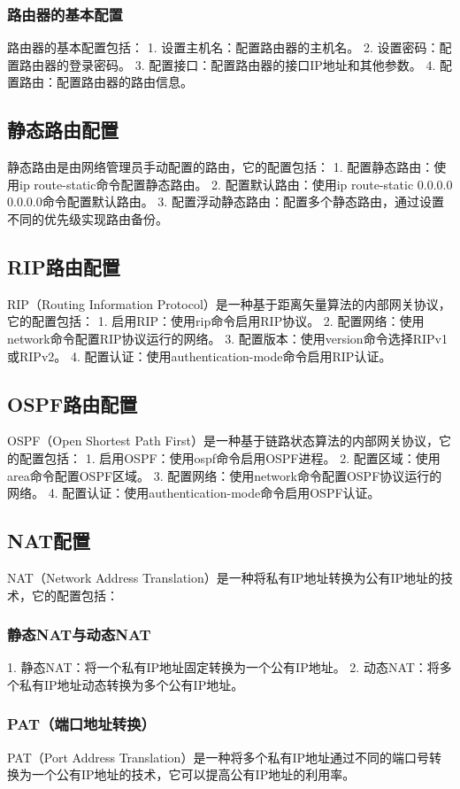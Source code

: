 \documentclass{book}
\begin{document}
\subsubsection{路由器的基本配置}
路由器的基本配置包括：
1. 设置主机名：配置路由器的主机名。
2. 设置密码：配置路由器的登录密码。
3. 配置接口：配置路由器的接口IP地址和其他参数。
4. 配置路由：配置路由器的路由信息。
\subsection{静态路由配置}
静态路由是由网络管理员手动配置的路由，它的配置包括：
1. 配置静态路由：使用ip route-static命令配置静态路由。
2. 配置默认路由：使用ip route-static 0.0.0.0 0.0.0.0命令配置默认路由。
3. 配置浮动静态路由：配置多个静态路由，通过设置不同的优先级实现路由备份。
\subsection{RIP路由配置}
RIP（Routing Information Protocol）是一种基于距离矢量算法的内部网关协议，它的配置包括：
1. 启用RIP：使用rip命令启用RIP协议。
2. 配置网络：使用network命令配置RIP协议运行的网络。
3. 配置版本：使用version命令选择RIPv1或RIPv2。
4. 配置认证：使用authentication-mode命令启用RIP认证。
\subsection{OSPF路由配置}
OSPF（Open Shortest Path First）是一种基于链路状态算法的内部网关协议，它的配置包括：
1. 启用OSPF：使用ospf命令启用OSPF进程。
2. 配置区域：使用area命令配置OSPF区域。
3. 配置网络：使用network命令配置OSPF协议运行的网络。
4. 配置认证：使用authentication-mode命令启用OSPF认证。
\subsection{NAT配置}
NAT（Network Address Translation）是一种将私有IP地址转换为公有IP地址的技术，它的配置包括：
\subsubsection{静态NAT与动态NAT}
1. 静态NAT：将一个私有IP地址固定转换为一个公有IP地址。
2. 动态NAT：将多个私有IP地址动态转换为多个公有IP地址。
\subsubsection{PAT（端口地址转换）}
PAT（Port Address Translation）是一种将多个私有IP地址通过不同的端口号转换为一个公有IP地址的技术，它可以提高公有IP地址的利用率。
\end{document}
